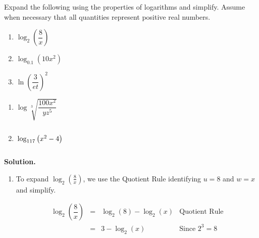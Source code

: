 \begin{ex}  \label{expandlogex} Expand the following using the properties of logarithms and simplify.  Assume when necessary that all quantities represent positive real numbers.

\begin{multicols}{3}
\begin{enumerate}

\item $\log_{2}\left(\dfrac{8}{x}\right)$ 

\item $\log_{0.1} \left(10 x^2 \right)$ 

\item  $\ln \left(\dfrac{3}{et}\right)^2$

\setcounter{HW}{\value{enumi}}
\end{enumerate}
\end{multicols}

\begin{multicols}{3}
\begin{enumerate}
\setcounter{enumi}{\value{HW}}

\item  $\log \sqrt[3]{\dfrac{100 x^2}{yz^5}}$

\item \label{factorlogpropex} $\vphantom{\log \sqrt[3]{\dfrac{100 x^2}{yz^5}}} \log_{117}\left(x^2 - 4\right)$

\setcounter{HW}{\value{enumi}}
\end{enumerate}
\end{multicols}

\newpage

{\bf Solution.}

\begin{enumerate}


\item  To expand $\log_{2}\left(\frac{8}{x}\right)$, we use the Quotient Rule identifying $u = 8$ and $w=x$ and simplify.

\setlength{\extrarowheight}{6pt}
\[ \begin{array}{rclr}

\log_{2}\left(\dfrac{8}{x}\right) & = &  \log_{2}(8) - \log_{2}(x) & \mbox{Quotient Rule} \\

& = &  3 - \log_{2}(x) & \mbox{Since $2^{3} = 8$} \\


\end{array}\]
\end{enumerate}
\end{ex}

